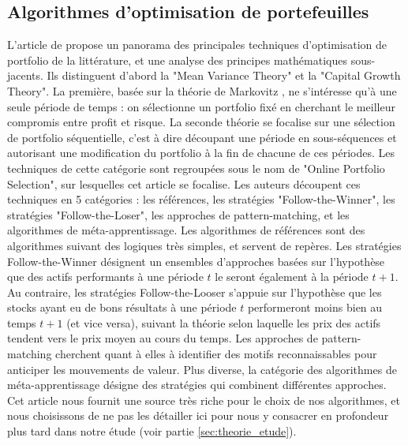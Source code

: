 \documentclass[a4paper, 10pt]{article}
\begin{document}
\subsection{Algorithmes d'optimisation de portefeuilles}
\label{sec:review_algo}

L'article de \textbf{\citet{Li2014} } propose un panorama des principales techniques d'optimisation de portfolio de la littérature, et une analyse des principes mathématiques sous-jacents. Ils distinguent d'abord la "Mean Variance Theory" et la "Capital Growth Theory". La première, basée sur la théorie de Markovitz \cite{Markovitz1952}, ne s'intéresse qu'à une seule période de temps : on sélectionne un portfolio fixé en cherchant le meilleur compromis entre profit et risque. La seconde théorie se focalise sur une sélection de portfolio séquentielle, c'est à dire découpant une période en sous-séquences et autorisant une modification du portfolio à la fin de chacune de ces périodes. Les techniques de cette catégorie sont regroupées sous le nom de "Online Portfolio Selection", sur lesquelles cet article se focalise. Les auteurs découpent ces techniques en 5 catégories : les références, les stratégies "Follow-the-Winner", les stratégies "Follow-the-Loser", les approches de pattern-matching, et les algorithmes de méta-apprentissage. Les algorithmes de références sont des algorithmes suivant des logiques très simples, et servent de repères. Les stratégies Follow-the-Winner désignent un ensembles d'approches basées sur l'hypothèse que des actifs performants à une période $t$ le seront également à la période $t+1$. Au contraire, les stratégies Follow-the-Looser s'appuie sur l'hypothèse que les stocks ayant eu de bons résultats à une période $t$ performeront moins bien au temps $t+1$ (et vice versa), suivant la théorie selon laquelle les prix des actifs tendent vers le prix moyen au cours du temps. Les approches de pattern-matching cherchent quant à elles à identifier des motifs reconnaissables pour anticiper les mouvements de valeur. Plus diverse, la catégorie des algorithmes de méta-apprentissage désigne des stratégies qui combinent différentes approches. Cet article nous fournit une source très riche pour le choix de nos algorithmes, et nous choisissons de ne pas les détailler ici pour nous y consacrer en profondeur plus tard dans notre étude (voir partie \ref{sec:theorie_etude}).
\end{document}
